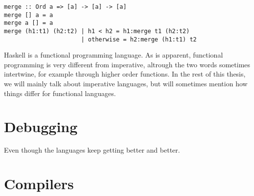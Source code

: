 \begin{verbatim}
merge :: Ord a => [a] -> [a] -> [a]
merge [] a = a
merge a [] = a
merge (h1:t1) (h2:t2) | h1 < h2 = h1:merge t1 (h2:t2)
                      | otherwise = h2:merge (h1:t1) t2
\end{verbatim}
Haskell is a functional programming language. As is apparent, functional programming is very different from imperative,
altrough the two words sometimes intertwine, for example through higher order functions. In the rest of this thesis, we will
mainly talk about imperative languages, but will sometimes mention how things differ for functional languages.

\section{Debugging}
Even though the languages keep getting better and better.

\section{Compilers}

